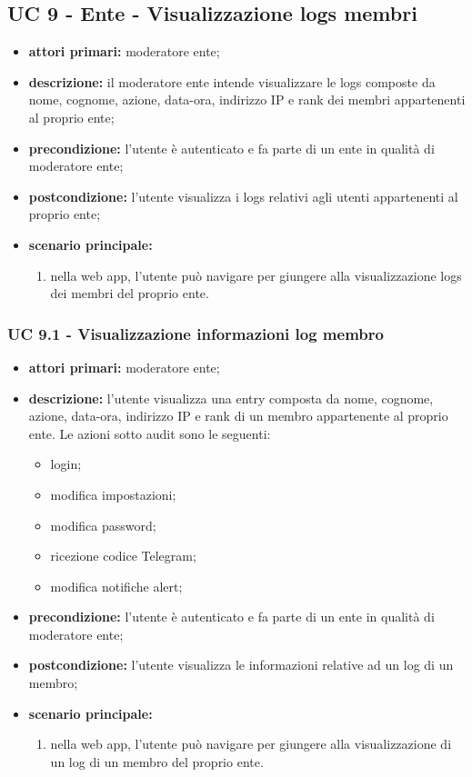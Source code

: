 		\subsection{UC 9 - Ente - Visualizzazione logs membri}
		\begin{itemize}
			\item \textbf{attori primari:} moderatore ente;
			\item \textbf{descrizione:} il moderatore ente intende visualizzare le logs composte da nome, cognome, azione, data-ora, indirizzo IP e rank dei membri appartenenti al proprio ente;
			\item \textbf{precondizione:} l'utente è autenticato e fa parte di un ente in qualità di moderatore ente;
			\item \textbf{postcondizione:} l'utente visualizza i logs relativi agli utenti appartenenti al proprio ente;
			\item \textbf{scenario principale:}
			\begin{enumerate}
				\item nella web app, l'utente può navigare per giungere alla visualizzazione logs dei membri del proprio ente.
			\end{enumerate}
		\end{itemize}

		\subsubsection{UC 9.1 - Visualizzazione informazioni log membro}
			\begin{itemize}
			\item \textbf{attori primari:} moderatore ente;
			\item \textbf{descrizione:} l'utente visualizza una entry composta da nome, cognome, azione, data-ora, indirizzo IP e rank di un membro appartenente al proprio ente. Le azioni sotto audit sono le seguenti:

			\begin{itemize}
				\item login;
				\item modifica impostazioni;
				\item modifica password;
				\item ricezione codice Telegram;
				\item modifica notifiche alert;
			\end{itemize}

			\item \textbf{precondizione:} l'utente è autenticato e fa parte di un ente in qualità di moderatore ente;
			\item \textbf{postcondizione:} l'utente visualizza le informazioni relative ad un log di un membro;
			\item \textbf{scenario principale:}
			\begin{enumerate}
				\item nella web app, l'utente può navigare per giungere alla visualizzazione di un log di un membro del proprio ente.
			\end{enumerate}
		\end{itemize}

